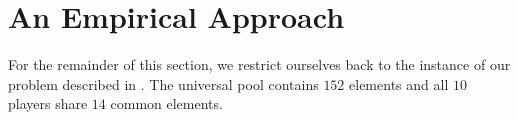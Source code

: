 \section{An Empirical Approach}\label{Section:Empirical-Approach}

For the remainder of this section, we restrict ourselves back to the instance of our problem described in .
The universal pool contains $152$ elements and all $10$ players share $14$ common elements.



